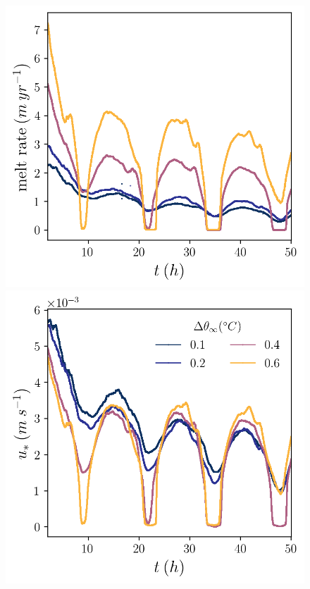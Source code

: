 \documentclass[draft]{agujournal2019}
\begin{document}
\begin{figure}[h!]
    \centering
    \begin{minipage}{0.4\textwidth}
        \includegraphics[trim={0 4cm 0 0},clip,width=\textwidth]{Figures/melt_cmp_dT_t.png}
    \end{minipage}%
    \begin{minipage}{0.4\textwidth}
        \includegraphics[trim={0 4cm 0 0},clip,width=\textwidth]{Figures/us_cmp_dT_t.png}

\end{minipage}
\end{figure}
\end{document}
